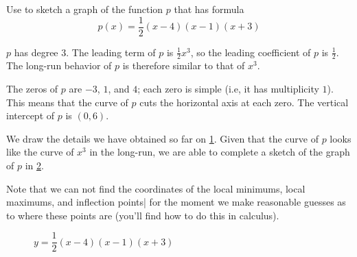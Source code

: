 	 \begin{pccexample}\label{poly:ex:simplecubic}
		 Use  to sketch a graph of the function $p$
		 that has formula
		 \[
			 p(x)=\frac{1}{2}(x-4)(x-1)(x+3)
		 \]
		 \begin{pccsolution}
			 \begin{steps}
				 \item $p$ has degree $3$. The leading term of $p$ is $\frac{1}{2}x^3$, so the leading coefficient of $p$
				 is $\frac{1}{2}$. The long-run behavior of $p$ is therefore similar to that of $x^3$.
				 \item The zeros of $p$ are $-3$, $1$, and $4$; each zero is simple (i.e, it has multiplicity $1$).
				 This means that the curve of $p$ cuts the horizontal axis at each zero. The vertical
				 intercept of $p$ is $(0,6)$.
				 \item We draw the details we have obtained so far on \cref{poly:fig:simplecubicp1}. Given
				 that the curve of $p$ looks like the curve of $x^3$ in the long-run, we are able to complete a sketch of the
				 graph of $p$ in \cref{poly:fig:simplecubicp2}.

				 Note that we can not find the coordinates of the local minimums, local maximums, and inflection
				 points| for the moment we make reasonable guesses as to where these points are (you'll find how
				 to do this in calculus).
			 \end{steps}

			 \begin{figure}[!htbp]
				 \begin{subfigure}{.45\textwidth}
					 \caption{}
					 \label{poly:fig:simplecubicp1}
				 \end{subfigure}%
				 \hfill
				 \begin{subfigure}{.45\textwidth}
					 \caption{}
					 \label{poly:fig:simplecubicp2}
				 \end{subfigure}%
				 \caption{$y=\dfrac{1}{2}(x-4)(x-1)(x+3)$}
				 \label{poly:fig:simplecubic}
			 \end{figure}
		 \end{pccsolution}
	 \end{pccexample}

